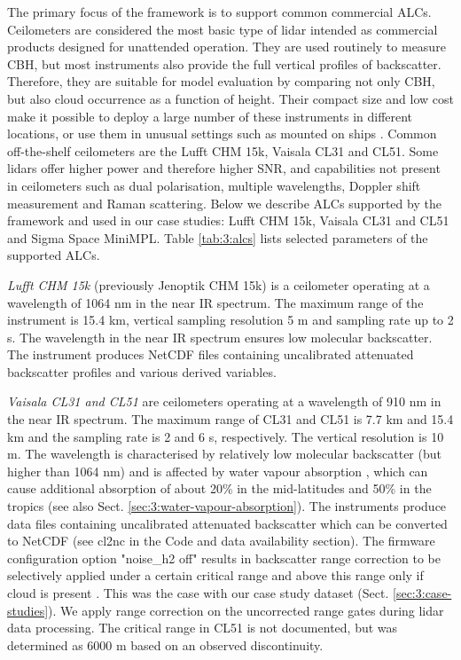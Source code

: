 The primary focus of the framework is to support common commercial ALCs.
Ceilometers are considered the most basic type of lidar \citep{emeis2010,kotthaus2016}
intended as commercial products designed for unattended operation.
They are used routinely to measure CBH, but most instruments also provide the
full vertical profiles of backscatter. Therefore, they are suitable for model
evaluation by comparing not only CBH, but also cloud occurrence as a function
of height. Their compact size and low cost make it possible to deploy a large
number of these instruments in different locations, or use them in unusual settings
such as mounted on ships \citep{klekociuk2019,kuma2020a}. Common off-the-shelf
ceilometers are
the Lufft CHM 15k, Vaisala CL31 and CL51.
Some lidars offer higher power
and therefore higher SNR, and capabilities not present in ceilometers such as
dual polarisation, multiple wavelengths, Doppler shift measurement and Raman scattering.
Below we describe ALCs supported by the framework and used in our case studies:
Lufft CHM 15k, Vaisala CL31 and CL51 and Sigma Space MiniMPL.
Table \ref{tab:3:alcs} lists selected parameters of the supported ALCs.

\textit{Lufft CHM 15k} (previously Jenoptik CHM 15k) is a ceilometer operating
at a wavelength of 1064 nm in the
near IR spectrum. The maximum range of the instrument is 15.4 km, vertical sampling
resolution 5 m and sampling rate up to 2 s. The wavelength in the near IR
spectrum ensures low molecular backscatter.
The instrument produces NetCDF files containing uncalibrated attenuated
backscatter profiles and various derived variables.

\textit{Vaisala CL31 and CL51} are ceilometers operating at a wavelength of 910
nm in the near IR spectrum. The maximum range of CL31 and CL51 is 7.7 km and 15.4 km
and the sampling rate is 2 and 6 s, respectively. The vertical resolution
is 10 m. The wavelength is characterised by relatively low molecular backscatter
(but higher than 1064 nm) and is affected by water vapour absorption
\citep{wiegner2015,wiegner2019}, which can cause additional absorption of about 
20\% in the mid-latitudes and 50\% in the tropics (see also Sect. \ref{sec:3:water-vapour-absorption}).
The instruments produce
data files containing uncalibrated attenuated backscatter which can be converted
to NetCDF (see cl2nc in the Code and data availability section).
The firmware configuration option "noise\_h2 off" results in backscatter
range correction to be selectively applied under a certain critical range
and above this range only if cloud is present \citep[Sect. 3.2]{kotthaus2016}.
This was the case with our case study dataset (Sect. \ref{sec:3:case-studies}).
We apply range correction on the uncorrected range gates during lidar
data processing. The critical range in CL51 is not documented, but was
determined as 6000 m based on an observed discontinuity.


